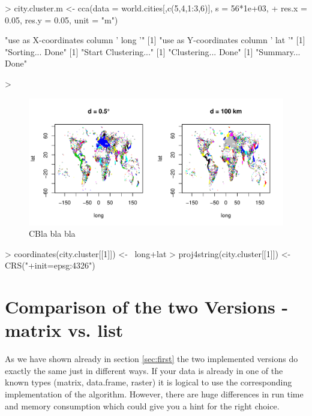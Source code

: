 \documentclass[10pt,a4paper]{article}
\begin{document}
\begin{Schunk}
\begin{Sinput}
> city.cluster.m <- cca(data = world.cities[,c(5,4,1:3,6)], s = 56*1e+03,
+                       res.x = 0.05, res.y = 0.05, unit = "m")
\end{Sinput}
\begin{Soutput}
[1] "use as X-coordinates column ' long '"
[1] "use as Y-coordinates column ' lat '"
[1] "Sorting... Done"
[1] "Start Clustering..."
[1] "Clustering... Done"
[1] "Summary... Done"
\end{Soutput}
\begin{Sinput}
> 
\end{Sinput}
\end{Schunk}


\begin{figure}
\centering
\includegraphics[width=\textwidth]{pics/point_data.pdf}
\caption{CBla bla bla}
\label{fig:landcover}
\end{figure}

\begin{Schunk}
\begin{Sinput}
>   coordinates(city.cluster[[1]]) <- ~long+lat
>   proj4string(city.cluster[[1]]) <- CRS("+init=epsg:4326")
\end{Sinput}
\end{Schunk}

\section{Comparison of the two Versions - matrix vs. list}
\label{sec:compare}

As we have shown already in section \ref{sec:first} the two implemented versions do exactly the same just in different ways. If your data is already in one of the known types (matrix, data.frame, raster) it is logical to use the corresponding implementation of the algorithm. However, there are huge differences in run time and memory consumption which could give you a hint for the right choice.
\end{document}
